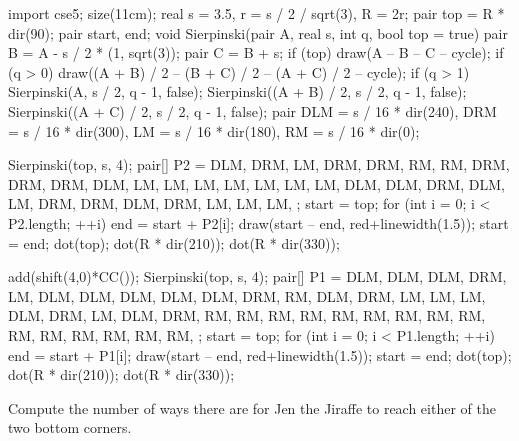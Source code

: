 	\begin{center}
		\begin{asy}
			import cse5;
			size(11cm);
			real s = 3.5, r = s / 2 / sqrt(3), R = 2r;
            pair top = R * dir(90);
            pair start, end;
			void Sierpinski(pair A, real s, int q, bool top = true) {
				pair B = A - s / 2 * (1, sqrt(3));
				pair C = B + s;
				if (top) draw(A -- B -- C -- cycle);
				if (q > 0) draw((A + B) / 2 -- (B + C) / 2 -- (A + C) / 2 -- cycle);
				if (q > 1) {
					Sierpinski(A, s / 2, q - 1, false);
					Sierpinski((A + B) / 2, s / 2, q - 1, false);
					Sierpinski((A + C) / 2, s / 2, q - 1, false);
				}
			}
            pair DLM = s / 16 * dir(240), DRM = s / 16 * dir(300), LM = s / 16 * dir(180), RM = s / 16 * dir(0);
            
			Sierpinski(top, s, 4);
            pair[] P2 = {
            	DLM, DRM, LM, DRM, DRM, RM, RM, DRM, DRM, DRM, DLM, LM, LM, LM, LM, LM, LM, LM,
                DLM, DLM, DRM, DLM, LM, DRM, DRM, DLM, DRM, LM, LM, LM,
            };
            start = top;
            for (int i = 0; i < P2.length; ++i) {
            	end = start + P2[i];
                draw(start -- end, red+linewidth(1.5));
                start = end;
            }
            dot(top); dot(R * dir(210)); dot(R * dir(330));
            
            add(shift(4,0)*CC());
            Sierpinski(top, s, 4);
            pair[] P1 = {
            	DLM, DLM, DLM, DRM, LM, DLM, DLM, DLM, DLM,
                DLM, DRM, RM, DLM, DRM, LM, LM, LM, DLM, DRM, LM, DLM, DRM, RM, RM, RM, RM, RM, RM, RM, RM, RM, RM, RM, RM, RM, RM, RM,
            };
            start = top;
            for (int i = 0; i < P1.length; ++i) {
            	end = start + P1[i];
                draw(start -- end, red+linewidth(1.5));
                start = end;
            }
            dot(top); dot(R * dir(210)); dot(R * dir(330));
		\end{asy}
	\end{center}
	Compute the number of ways there are for Jen the Jiraffe to reach either of the two bottom corners.